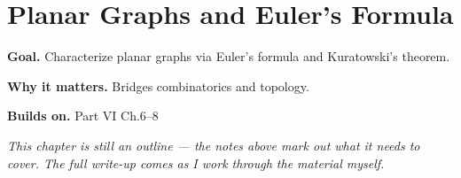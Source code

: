 \chapter{Planar Graphs and Euler's Formula}
\label{ch:06-combinatorics-and-graph-theory-10}

\begin{chapterintro}
\textbf{Goal.} Characterize planar graphs via Euler's formula and Kuratowski's theorem.

\textbf{Why it matters.} Bridges combinatorics and topology.

\textbf{Builds on.} Part VI Ch.6–8
\end{chapterintro}

\textit{This chapter is still an outline --- the notes above mark out what it needs to cover. The full write-up comes as I work through the material myself.}
